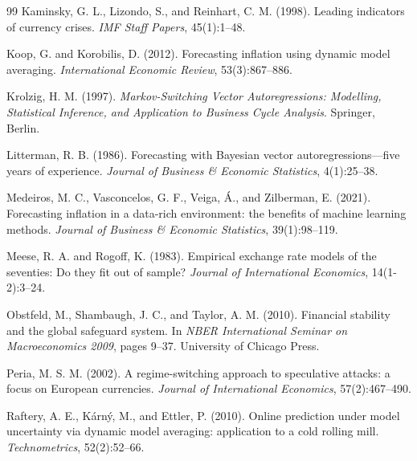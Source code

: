 \documentclass[12pt,a4paper]{article}
\begin{document}
\begin{thebibliography}{99}
Kaminsky, G. L., Lizondo, S., and Reinhart, C. M. (1998).
\newblock Leading indicators of currency crises.
\newblock \textit{IMF Staff Papers}, 45(1):1--48.

Koop, G. and Korobilis, D. (2012).
\newblock Forecasting inflation using dynamic model averaging.
\newblock \textit{International Economic Review}, 53(3):867--886.

Krolzig, H. M. (1997).
\newblock \textit{Markov-Switching Vector Autoregressions: Modelling, Statistical Inference, and Application to Business Cycle Analysis}.
\newblock Springer, Berlin.

Litterman, R. B. (1986).
\newblock Forecasting with Bayesian vector autoregressions---five years of experience.
\newblock \textit{Journal of Business \& Economic Statistics}, 4(1):25--38.

Medeiros, M. C., Vasconcelos, G. F., Veiga, \'{A}., and Zilberman, E. (2021).
\newblock Forecasting inflation in a data-rich environment: the benefits of machine learning methods.
\newblock \textit{Journal of Business \& Economic Statistics}, 39(1):98--119.

Meese, R. A. and Rogoff, K. (1983).
\newblock Empirical exchange rate models of the seventies: Do they fit out of sample?
\newblock \textit{Journal of International Economics}, 14(1-2):3--24.

Obstfeld, M., Shambaugh, J. C., and Taylor, A. M. (2010).
\newblock Financial stability and the global safeguard system.
\newblock In \textit{NBER International Seminar on Macroeconomics 2009}, pages 9--37. University of Chicago Press.

Peria, M. S. M. (2002).
\newblock A regime-switching approach to speculative attacks: a focus on European currencies.
\newblock \textit{Journal of International Economics}, 57(2):467--490.

Raftery, A. E., K\'{a}rn\'{y}, M., and Ettler, P. (2010).
\newblock Online prediction under model uncertainty via dynamic model averaging: application to a cold rolling mill.
\newblock \textit{Technometrics}, 52(2):52--66.


\end{thebibliography}
\end{document}
